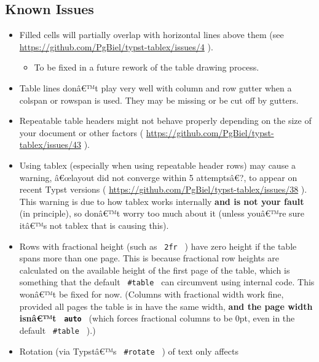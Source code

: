 
\subsection{Known Issues}\label{known-issues}

\begin{itemize}
\item
  Filled cells will partially overlap with horizontal lines above them
  (see \url{https://github.com/PgBiel/typst-tablex/issues/4} ).

  \begin{itemize}
  \tightlist
  \item
    To be fixed in a future rework of the table drawing process.
  \end{itemize}
\item
  Table lines donâ€™t play very well with column and row gutter when a
  colspan or rowspan is used. They may be missing or be cut off by
  gutters.
\item
  Repeatable table headers might not behave properly depending on the
  size of your document or other factors (
  \url{https://github.com/PgBiel/typst-tablex/issues/43} ).
\item
  Using tablex (especially when using repeatable header rows) may cause
  a warning, â€œlayout did not converge within 5 attemptsâ€?, to appear
  on recent Typst versions (
  \url{https://github.com/PgBiel/typst-tablex/issues/38} ). This warning
  is due to how tablex works internally \textbf{and is not your fault}
  (in principle), so donâ€™t worry too much about it (unless youâ€™re
  sure itâ€™s not tablex that is causing this).
\item
  Rows with fractional height (such as \texttt{\ 2fr\ } ) have zero
  height if the table spans more than one page. This is because
  fractional row heights are calculated on the available height of the
  first page of the table, which is something that the default
  \texttt{\ \#table\ } can circumvent using internal code. This wonâ€™t
  be fixed for now. (Columns with fractional width work fine, provided
  all pages the table is in have the same width, \textbf{and the page
  width isnâ€™t \texttt{\ auto\ }} (which forces fractional columns to
  be 0pt, even in the default \texttt{\ \#table\ } ).)
\item
  Rotation (via Typstâ€™s \texttt{\ \#rotate\ } ) of text only affects

\end{itemize}
